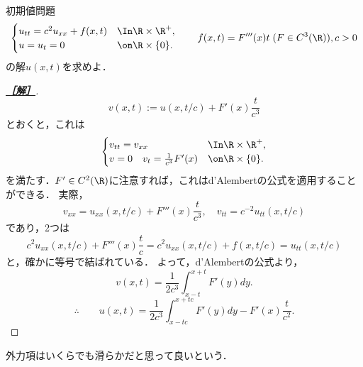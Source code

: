 \documentclass[uplatex,dvipdfmx]{jsarticle}
\begin{document}
\begin{problem}
    初期値問題
    \[\begin{cases}
        u_{tt}=c^2u_{xx}+f(x,t)&\In\R\times\R^+,\\
        u=u_t=0&\on\R\times\{0\}.
    \end{cases}\qquad f(x,t)=F'''(x)t\;(F\in C^3(\R)),c>0\]
    の解$u(x,t)$を求めよ．
\end{problem}
\begin{proof}[\bf\underline{［解］}]
    \[v(x,t):=u(x,t/c)+F'(x)\frac{t}{c^3}\]
    とおくと，これは
    \[\begin{cases}
        v_{tt}=v_{xx}&\In\R\times\R^+,\\
        v=0\quad v_t=\frac{1}{c^3}F'(x)&\on\R\times\{0\}.
    \end{cases}\]
    を満たす．$F'\in C^2(\R)$に注意すれば，これはd'Alembertの公式を適用することができる．
    実際，
    \[v_{xx}=u_{xx}(x,t/c)+F'''(x)\frac{t}{c^3},\quad v_{tt}=c^{-2}u_{tt}(x,t/c)\]
    であり，2つは
    \[c^2u_{xx}(x,t/c)+F'''(x)\frac{t}{c}=c^2u_{xx}(x,t/c)+f(x,t/c)=u_{tt}(x,t/c)\]
    と，確かに等号で結ばれている．
    よって，d'Alembertの公式より，
    \[v(x,t)=\frac{1}{2c^3}\int^{x+t}_{x-t}F'(y)dy.\]
    \[\therefore\qquad u(x,t)=\frac{1}{2c^3}\int^{x+tc}_{x-tc}F'(y)dy-F'(x)\frac{t}{c^2}.\]
\end{proof}
\begin{remarks*}
    外力項はいくらでも滑らかだと思って良いという．
\end{remarks*}
\end{document}
